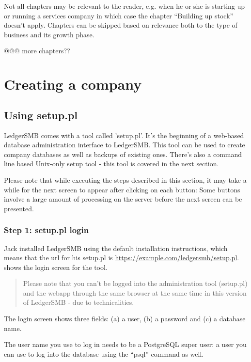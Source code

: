 Not all chapters may be relevant to the reader, e.g. when he or she is starting up or
running a services company in which case the chapter ``Building up stock'' doesn't apply.
Chapters can be skipped based on relevance both to the type of business and its growth
phase.

@@@ more chapters??


\chapter{Creating a company}
\label{cha-company-creation}

\section{Using setup.pl}
\label{sec-create-using-setup}

LedgerSMB comes with a tool called 'setup.pl'. It's the beginning of a web-based
database administration interface to LedgerSMB. This tool can be used to create
company databases as well as backups of existing ones. There's also a command line based
Unix-only setup tool - this tool is covered in the next section.

Please note that while executing the steps described in this section, it may take a while
for the next screen to appear after clicking on each button: Some buttons involve
a large amount of processing on the server before the next screen can be presented.

\subsection{Step 1: setup.pl login}
\label{subsec-create-setup-login}

Jack installed LedgerSMB using the default installation instructions, which means
that the url for his setup.pl is \url{https://example.com/ledgersmb/setup.pl}.
 shows the login screen for the tool.

\begin{quotation}
Please note that you can't be logged into the administration tool (setup.pl) and the webapp
through the same browser at the same time in this version of LedgerSMB - due to technicalities.
\end{quotation}

The login screen shows three fields: (a) a user, (b) a password and (c) a database name.

The user name you use to log in needs to be a PostgreSQL super user: a user you can use
to log into the database using the ``psql'' command as well.

